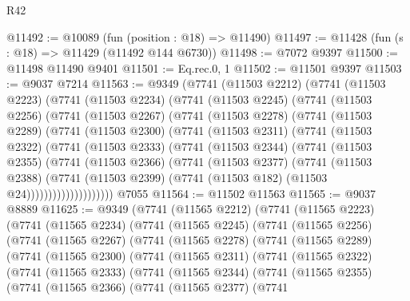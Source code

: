 \begin{lexlean}{R42}
\begin{coremodule}
{@11492 := @10089 (fun (position : @18) => @11490)
@11497 := @11428 (fun (s : @18) => @11429 (@11492 @144 @6730))
@11498 := @7072 @9397
@11500 := @11498 @11490 @9401
@11501 := Eq.rec.{0, 1}
@11502 := @11501 @9397
@11503 := @9037 @7214
@11563 := @9349
    (@7741
      (@11503 @2212)
      (@7741
        (@11503 @2223)
        (@7741
          (@11503 @2234)
          (@7741
            (@11503 @2245)
            (@7741
              (@11503 @2256)
              (@7741
                (@11503 @2267)
                (@7741
                  (@11503 @2278)
                  (@7741
                    (@11503 @2289)
                    (@7741
                      (@11503 @2300)
                      (@7741
                        (@11503 @2311)
                        (@7741
                          (@11503 @2322)
                          (@7741
                            (@11503 @2333)
                            (@7741
                              (@11503 @2344)
                              (@7741
                                (@11503 @2355)
                                (@7741
                                  (@11503 @2366)
                                  (@7741
                                    (@11503 @2377)
                                    (@7741
                                      (@11503 @2388)
                                      (@7741
                                        (@11503 @2399)
                                        (@7741 (@11503 @182) (@11503 @24))))))))))))))))))))
    @7055
@11564 := @11502 @11563
@11565 := @9037 @8889
@11625 := @9349
    (@7741
      (@11565 @2212)
      (@7741
        (@11565 @2223)
        (@7741
          (@11565 @2234)
          (@7741
            (@11565 @2245)
            (@7741
              (@11565 @2256)
              (@7741
                (@11565 @2267)
                (@7741
                  (@11565 @2278)
                  (@7741
                    (@11565 @2289)
                    (@7741
                      (@11565 @2300)
                      (@7741
                        (@11565 @2311)
                        (@7741
                          (@11565 @2322)
                          (@7741
                            (@11565 @2333)
                            (@7741
                              (@11565 @2344)
                              (@7741
                                (@11565 @2355)
                                (@7741
                                  (@11565 @2366)
                                  (@7741
                                    (@11565 @2377)
                                    (@7741
}
\end{coremodule}
\end{lexlean}

